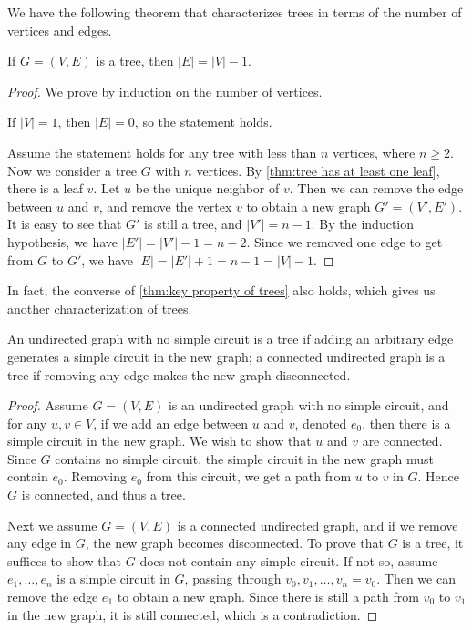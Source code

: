 We have the following theorem that characterizes trees in terms of the number of vertices and edges.

\begin{theorem}
    If $G=(V,E)$ is a tree, then $|E|=|V|-1$.
\end{theorem}

\begin{proof}
    We prove by induction on the number of vertices. 
    
    If $|V|=1$, then $|E|=0$, so the statement holds. 
    
    Assume the statement holds for any tree with less than $n$ vertices, where $n\geq 2$. Now we consider a tree $G$ with $n$ vertices. By \cref{thm:tree has at least one leaf}, there is a leaf $v$. Let $u$ be the unique neighbor of $v$. Then we can remove the edge between $u$ and $v$, and remove the vertex $v$ to obtain a new graph $G'=(V',E')$. It is easy to see that $G'$ is still a tree, and $|V'|=n-1$. By the induction hypothesis, we have $|E'|=|V'|-1=n-2$. Since we removed one edge to get from $G$ to $G'$, we have $|E|=|E'|+1=n-1=|V|-1$.
\end{proof}

In fact, the converse of \cref{thm:key property of trees} also holds, which gives us another characterization of trees.

\begin{theorem}
    An undirected graph with no simple circuit is a tree if adding an arbitrary edge generates a simple circuit in the new graph; a connected undirected graph is a tree if removing any edge makes the new graph disconnected.
\end{theorem}

\begin{proof}
    Assume $G=(V,E)$ is an undirected graph with no simple circuit, and for any $u,v\in V$, if we add an edge between $u$ and $v$, denoted $e_0$, then there is a simple circuit in the new graph. We wish to show that $u$ and $v$ are connected. Since $G$ contains no simple circuit, the simple circuit in the new graph must contain $e_0$. Removing $e_0$ from this circuit, we get a path from $u$ to $v$ in $G$. Hence $G$ is connected, and thus a tree.

    Next we assume $G=(V,E)$ is a connected undirected graph, and if we remove any edge in $G$, the new graph becomes disconnected. To prove that $G$ is a tree, it suffices to show that $G$ does not contain any simple circuit. If not so, assume $e_1,\dots,e_n$ is a simple circuit in $G$, passing through $v_0,v_1,\dots,v_n=v_0$. Then we can remove the edge $e_1$ to obtain a new graph. Since there is still a path from $v_0$ to $v_1$ in the new graph, it is still connected, which is a contradiction. 
\end{proof}

